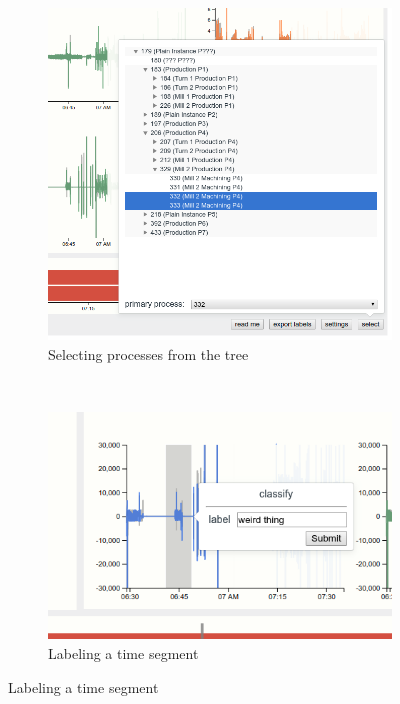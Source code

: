 \documentclass[naustrian]{scrartcl}
\begin{document}
\begin{figure}
    \centering
    \begin{subfigure}{0.5\textwidth}
        \centering
        \includegraphics[width=\textwidth]{img/select.png}
        \caption{Selecting processes from the tree}
        \label{fig:select}
    \end{subfigure}%
    ~
    \begin{subfigure}{0.5\textwidth}
        \centering
        \includegraphics[width=\textwidth]{img/label-dialog.png}
        \caption{Labeling a time segment}
        \label{fig:label}

\end{subfigure}
\end{figure}
\end{document}
